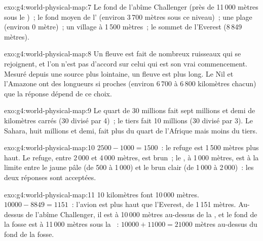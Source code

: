 \begin{solution}{exo:g4:world-physical-map:7}
Le fond de l'abîme Challenger (près de 11\,000 mètres sous le )~; le fond moyen de l' (environ 3\,700 mètres sous ce niveau)~;
une plage (environ 0 mètre)~; un village à 1\,500 mètres~; le sommet de
l'Everest (8\,849 mètres).
\end{solution}

\begin{solution}{exo:g4:world-physical-map:8}
Un fleuve est fait de nombreux ruisseaux qui se rejoignent, et l'on n'est
pas d'accord sur celui qui est son vrai commencement. Mesuré depuis une
source plus lointaine, un fleuve est plus long. Le Nil et l'Amazone ont des
longueurs si proches (environ 6\,700 à 6\,800 kilomètres chacun) que la
réponse dépend de ce choix.
\end{solution}

\begin{solution}{exo:g4:world-physical-map:9}
Le quart de 30 millions fait sept millions et demi de kilomètres carrés
(30 divisé par 4)~; le tiers fait 10 millions (30 divisé par 3). Le
Sahara, huit millions et demi, fait plus du quart de l'Afrique mais moins
du tiers.
\end{solution}

\begin{solution}{exo:g4:world-physical-map:10}
$2500 - 1000 = 1500$~: le refuge est 1\,500 mètres plus haut. Le refuge,
entre 2\,000 et 4\,000 mètres, est brun~; le , à 1\,000 mètres, est à la
limite entre le jaune pâle (de 500 à 1\,000) et le brun clair (de 1\,000 à
2\,000)~: les deux réponses sont acceptées.
\end{solution}

\begin{solution}{exo:g4:world-physical-map:11}
10 kilomètres font 10\,000 mètres. $10000 - 8849 = 1151$~: l'avion est
plus haut que l'Everest, de 1\,151 mètres. Au-dessus de l'abîme
Challenger, il est à 10\,000 mètres au-dessus de la , et le fond de la
fosse est à 11\,000 mètres sous la ~: $10000 + 11000 = 21000$ mètres
au-dessus du fond de la fosse.
\end{solution}
